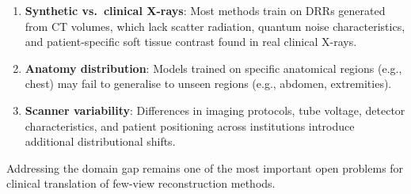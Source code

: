 \begin{enumerate}
  \item \textbf{Synthetic vs.\ clinical X-rays}: Most methods train on DRRs generated from CT volumes, which lack scatter radiation, quantum noise characteristics, and patient-specific soft tissue contrast found in real clinical X-rays.

  \item \textbf{Anatomy distribution}: Models trained on specific anatomical regions (e.g., chest) may fail to generalise to unseen regions (e.g., abdomen, extremities).

  \item \textbf{Scanner variability}: Differences in imaging protocols, tube voltage, detector characteristics, and patient positioning across institutions introduce additional distributional shifts.
\end{enumerate}

Addressing the domain gap remains one of the most important open problems for clinical translation of few-view reconstruction methods.

